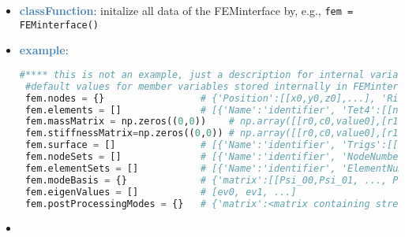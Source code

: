 \begin{itemize}[leftmargin=1.4cm]
\begin{itemize}[leftmargin=1.4cm]
\begin{itemize}[leftmargin=0.5cm]
\begin{itemize}[leftmargin=1.4cm]
\begin{itemize}[leftmargin=1.4cm]
\begin{itemize}[leftmargin=0.5cm]
\setlength{\itemindent}{0.7cm}
\begin{itemize}[leftmargin=0.7cm]
  \item[--]  \textcolor{steelblue}{\bf classFunction}: initalize all data of the FEMinterface by, e.g., \texttt{fem = FEMinterface()}  \item[--]  \textcolor{steelblue}{\bf example}: \vspace{-12pt}\ei\begin{lstlisting}[language=Python, xleftmargin=36pt]
#**** this is not an example, just a description for internal variables ****
 #default values for member variables stored internally in FEMinterface fem and typical structure:
 fem.nodes = {}                 # {'Position':[[x0,y0,z0],...], 'RigidBodyRxyz':[[x0,y0,z0],...],  },...]                     #dictionary of different node lists
 fem.elements = []              # [{'Name':'identifier', 'Tet4':[[n0,n1,n2,n3],...], 'Hex8':[[n0,...,n7],...],  },...]        #there may be several element sets
 fem.massMatrix = np.zeros((0,0))    # np.array([[r0,c0,value0],[r1,c1,value1], ... ])                                #currently only in SparseCSR format allowed!
 fem.stiffnessMatrix=np.zeros((0,0)) # np.array([[r0,c0,value0],[r1,c1,value1], ... ])                                #currently only in SparseCSR format allowed!
 fem.surface = []               # [{'Name':'identifier', 'Trigs':[[n0,n1,n2],...], 'Quads':[[n0,...,n3],...],  },...]           #surface with faces
 fem.nodeSets = []              # [{'Name':'identifier', 'NodeNumbers':[n_0,...,n_ns], 'NodeWeights':[w_0,...,w_ns]},...]     #for boundary conditions, etc.
 fem.elementSets = []           # [{'Name':'identifier', 'ElementNumbers':[n_0,...,n_ns]},...]                                #for different volumes, etc.
 fem.modeBasis = {}             # {'matrix':[[Psi_00,Psi_01, ..., Psi_0m],...,[Psi_n0,Psi_n1, ..., Psi_nm]],'type':'NormalModes'} #'NormalModes' are eigenmodes, 'HCBmodes' are Craig-Bampton modes including static modes
 fem.eigenValues = []           # [ev0, ev1, ...]                                                                             #eigenvalues according to eigenvectors in mode basis
 fem.postProcessingModes = {}   # {'matrix':<matrix containing stress components (xx,yy,zz,yz,xz,xy) in each column, rows are for every mesh node>,'outputVariableType':exudyn.OutputVariableType.StressLocal}\end{lstlisting}\vspace{-24pt}\bi\item[]\vspace{-24pt}\vspace{12pt}\end{itemize}

\end{itemize}
\end{itemize}
\end{itemize}
\end{itemize}
\end{itemize}
\end{itemize}
